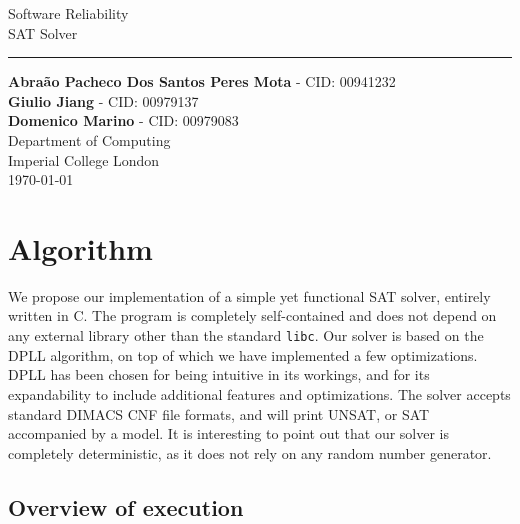 \documentclass[a4paper]{article}
\begin{document}
\begin{titlepage}
    \begin{center}
        \vspace*{1cm}
        \vspace*{1cm}          
        \vspace{0.5cm}
        \LARGE
        Software Reliability\\ SAT Solver\\
                \noindent\rule{8cm}{0.4pt}
        \vspace{1.5cm}
 
        \large
        \textbf{Abra\~{a}o Pacheco Dos Santos Peres Mota} - CID: 00941232 \\
        \textbf{Giulio Jiang} - CID: 00979137 \\
        \textbf{Domenico Marino} - CID: 00979083 \\

        \vfill
        \vspace{0.8cm}
        \Large
        Department of Computing\\
        Imperial College London\\
        \today
        
    \end{center}
\end{titlepage}


\newpage

\section{Algorithm}

We propose our implementation of a simple yet functional SAT solver, entirely written in C. The program is completely self-contained and does not depend on any external library other than the standard \texttt{libc}. Our solver is based on the DPLL algorithm, on top of which we have implemented a few optimizations. DPLL has been chosen for being intuitive in its workings, and for its expandability to include additional features and optimizations. The solver accepts standard DIMACS CNF file formats, and will print UNSAT, or SAT accompanied by a model. It is interesting to point out that our solver is completely deterministic, as it does not rely on any random number generator.

\subsection{Overview of execution}
\end{document}

